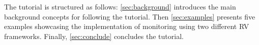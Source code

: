 The tutorial is structured as follows: \cref{sec:background} introduces the main background concepts for following the tutorial.
Then \cref{sec:examples} presents five examples showcasing the implementation of monitoring using two different RV frameworks.
Finally, \cref{sec:conclude} concludes the tutorial.